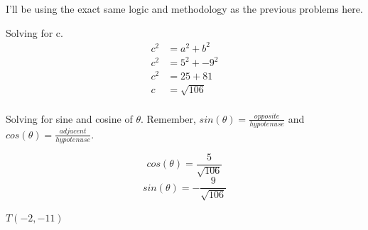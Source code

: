 \documentclass[10pt,letterpaper]{amspset}
\begin{document}
\begin{solution}[Solution]
I'll be using the exact same logic and methodology as the previous problems here. 
\bigskip



Solving for c.
\begin{align}
c^2 &= a^2 + b^2 \\
c^2 &= 5^2 + -9^2 \\
c^2 &= 25 + 81 \\
c &= \sqrt{106} \\
\end{align}

Solving for sine and cosine of $\theta$. Remember, $sin(\theta) = \frac{opposite}{hypotenuse}$ and $cos(\theta) = \frac{adjacent}{hypotenuse}$.

\[\boxed{cos(\theta) = \frac{5}{\sqrt{106}}}\]
\[\boxed{sin(\theta) = -\frac{9}{\sqrt{106}}}\]
\end{solution}


\pagebreak


\begin{problem}[68.]
$T(-2, -11)$
\end{problem}
\end{document}
